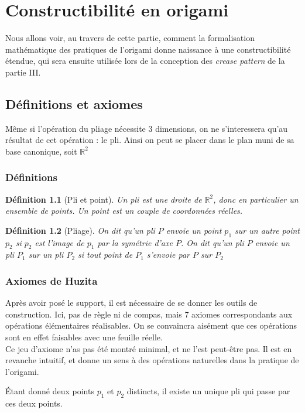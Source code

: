 \documentclass[a4paper,12pt,french]{report}
\newtheorem{definition}{Définition}[section]
\begin{document}




\chapter{Constructibilité en origami}
	Nous allons voir, au travers de cette partie, comment la formalisation mathématique des pratiques de l'origami donne naissance à une constructibilité étendue, qui sera ensuite utilisée lors de la conception des \emph{crease pattern} de la partie III.

	\section{Définitions et axiomes}
		Même si l'opération du pliage nécessite 3 dimensions, on ne s'interessera qu'au résultat de cet opération : le pli. Ainsi on peut se placer dans le plan muni de sa base canonique, soit $\mathbb{R}^{2}$
	\subsection{Définitions}
		\begin{definition}[Pli et point]
			Un \emph{pli} est une droite de $\mathbb{R}^{2}$, donc en particulier un ensemble de points. Un \emph{point} est un couple de coordonnées réelles.
		\end{definition}
		\begin{definition}[Pliage]
			On dit qu'un pli $P$ \emph{envoie} un point $p_{1}$ sur un autre point $p_{2}$ si $p_{2}$ est l'image de $p_{1}$ par la symétrie d'axe $P$. On dit qu'un pli $P$ \emph{envoie} un pli $P_{1}$ sur un pli $P_{2}$ si tout point de $P_{1}$ s'envoie par $P$ sur $P_{2}$
		\end{definition}
		
	\subsection{Axiomes de Huzita}
		Après avoir posé le support, il est nécessaire de se donner les outils de construction. Ici, pas de règle ni de compas, mais 7 axiomes correspondants aux opérations élémentaires réalisables. On se convaincra aisément que ces opérations sont en effet faisables avec une feuille réelle. \\
		Ce jeu d'axiome n'as pas été montré minimal, et ne l'est peut-être pas. Il est en revanche intuitif, et donne un sens à des opérations naturelles dans la pratique de l'origami. 
		\begin{axiome}[1]
			Étant donné deux points $p_{1}$ et $p_{2}$ distincts, il existe un unique pli qui passe par ces deux points.
		\end{axiome}
		
\end{document}
